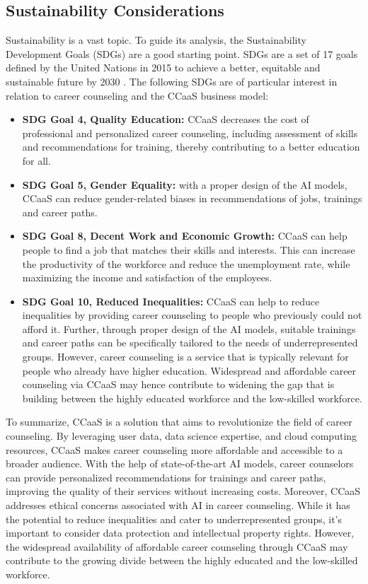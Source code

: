 \subsection{Sustainability Considerations}

Sustainability is a vast topic. To guide its analysis, the Sustainability Development Goals (SDGs) are a
good starting point. SDGs are a set of 17 goals defined by the United Nations in 2015 to achieve a better,
equitable and sustainable future by 2030 \citep{unitednationsTransformingOurWorld2015a}. The following SDGs
are of particular interest in relation to career counseling and the CCaaS business model:

\begin{itemize}
    \item \textbf{SDG Goal 4, Quality Education:} CCaaS decreases the cost of professional and personalized
        career counseling, including assessment of skills and recommendations for training, thereby
        contributing to a better education for all.
    \item \textbf{SDG Goal 5, Gender Equality:} with a proper design of the AI models, CCaaS can reduce 
        gender-related biases in recommendations of jobs, trainings and career paths.
    \item \textbf{SDG Goal 8, Decent Work and Economic Growth:} CCaaS can help people to find a job that
        matches their skills and interests. This can increase the productivity of the workforce and
        reduce the unemployment rate, while maximizing the income and satisfaction of the employees.
    \item \textbf{SDG Goal 10, Reduced Inequalities:} CCaaS can help to reduce inequalities by providing
        career counseling to people who previously could not afford it. Further, through proper design
        of the AI models, suitable trainings and career paths can be specifically tailored to the
        needs of underrepresented groups. However, career counseling is a service that is typically
        relevant for people who already have higher education. Widespread and affordable career
        counseling via CCaaS may hence contribute to widening the gap that is building between the
        highly educated workforce and the low-skilled workforce.
\end{itemize}


To summarize, CCaaS is a solution that aims to revolutionize the field of career counseling. By leveraging
user data, data science expertise, and cloud computing resources, CCaaS makes career counseling more affordable
and accessible to a broader audience. With the help of state-of-the-art AI models, career counselors can provide
personalized recommendations for trainings and career paths, improving the quality of their services without
increasing costs. Moreover, CCaaS addresses ethical concerns associated with AI in career counseling. While it
has the potential to reduce inequalities and cater to underrepresented groups, it's important to consider data
protection and intellectual property rights. However, the widespread availability of affordable career counseling
through CCaaS may contribute to the growing divide between the highly educated and the low-skilled workforce.